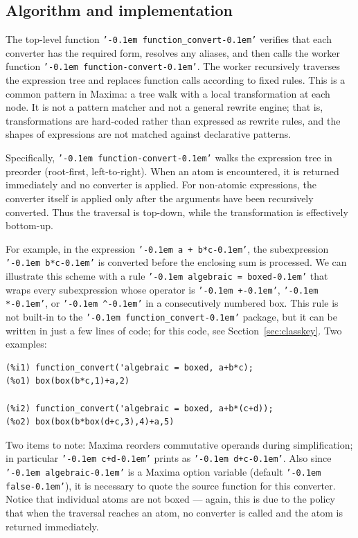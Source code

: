 \documentclass[12pt,fleqn]{extarticle}
\newcommand{\ttq}[1]{\texttt{'\kern-0.1em #1\kern-0.1em'}}
\newcommand{\funconvert}{\ttq{function\_convert}{ }}
\newenvironment{maximabox}
  {\begin{tcolorbox}[
      breakable,
      enhanced,
      colback=white,
      colframe=black!8,
      boxrule=0pt,
      borderline west={2.2pt}{0pt}{black!25},
      arc=1pt,
      left=11pt,
      right=7pt,
      top=9pt,
      bottom=9pt,
      before skip=14pt,
      after skip=14pt
    ]}
  {\end{tcolorbox}}
\begin{document}
\subsection{Algorithm and implementation}
\label{sec:algorithm}

The top-level function \ttq{function\_convert} verifies that each converter has the required form, 
resolves any aliases, and then calls the worker function \ttq{function-convert}. The worker 
recursively traverses the expression tree and replaces function calls according to fixed rules. This is a common pattern in Maxima: a tree walk with a local transformation at each node. It is not a pattern matcher and not a general rewrite engine; that is, transformations are hard-coded rather than expressed as rewrite rules, and the shapes of expressions are not matched against declarative patterns.

Specifically, \ttq{function-convert} walks the expression tree in preorder (root-first, left-to-right). When an atom is encountered, it is returned immediately and no converter is applied. For non-atomic expressions, the converter itself is applied only after the arguments have been recursively converted. Thus the traversal is top-down, while the transformation is effectively bottom-up.

For example, in the expression \ttq{a + b*c}, the subexpression \ttq{b*c} is converted before the enclosing sum is processed. We can illustrate this scheme with a rule  \ttq{algebraic = boxed} that
wraps every subexpression whose operator is \ttq{+}, \ttq{*}, or
\ttq{\^{}} in a consecutively numbered box.  This rule is not built-in to the 
\funconvert package, but it can be written in just a few lines of code; for this code, 
see Section~\ref{sec:classkey}. Two examples:

\begin{maximabox}
\begin{verbatim}
(%i1) function_convert('algebraic = boxed, a+b*c);
(%o1) box(box(b*c,1)+a,2)

(%i2) function_convert('algebraic = boxed, a+b*(c+d));
(%o2) box(box(b*box(d+c,3),4)+a,5)
\end{verbatim}
\end{maximabox}
\noindent Two items to note: Maxima reorders commutative operands during simplification; in particular \ttq{c+d}
prints as \ttq{d+c}. Also since \ttq{algebraic} is a Maxima option variable (default \ttq{false}),
it is necessary to quote the source function for this converter. Notice that individual atoms are not boxed --- again, this is due to the policy that when the traversal reaches an atom, no converter is called and
the atom is returned immediately.
\end{document}

